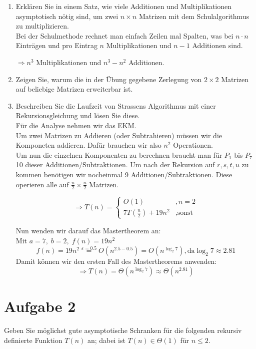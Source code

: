 \documentclass[11pt,a4paper,ngerman]{article}
\begin{document}
\begin{enumerate}[\bfseries (a)]

\item Erklären Sie in einem Satz, wie viele Additionen und Multiplikationen asymptotisch nötig sind, um zwei $n \times n$ Matrizen mit dem Schulalgorithmus zu multiplizieren.\\

Bei der Schulmethode rechnet man einfach Zeilen mal Spalten, was bei $n \cdot n$ Einträgen und pro Eintrag $n$ Multiplikationen und $n-1$ Additionen sind.

$\Rightarrow n^3$ Multiplikationen und $n^3 - n^2$ Additionen.

\item Zeigen Sie, warum die in der Übung gegebene Zerlegung von $2\times2$ Matrizen auf beliebige Matrizen erweiterbar ist.\\

\item Beschreiben Sie die Laufzeit von Strassens Algorithmus mit einer Rekursionsgleichung und lösen Sie diese.\\

Für die Analyse nehmen wir das EKM.\\
Um zwei Matrizen zu Addieren (oder Subtrahieren) müssen wir die Komponeten addieren. Dafür brauchen wir also $n^2$ Operationen.\\
Um nun die einzelnen Komponenten zu berechnen braucht man für $P_1$ bis $P_7$ 10 dieser Additionen/Subtraktionen. Um nach der Rekursion auf $r,s,t,u$ zu kommen benötigen wir nocheinmal 9 Additionen/Subtraktionen. Diese operieren alle auf $\frac{n}{2}\times\frac{n}{2}$ Matrizen.

$$
\Rightarrow T(n) = \left\{ 
\begin{array}{lr}
O(1)&,n = 2\\
7 T(\frac{n}{2}) + 19n^2&,\text{sonst}
\end{array}
\right.
$$

Nun wenden wir darauf das Mastertheorem an:\\
Mit $a=7, \; b=2, \; f(n) = 19n^2$\\
$$
f(n) = 19n^2 \stackrel{\varepsilon = 0.5}{=} O(n^{2.5 - 0.5}) =O( n^{\log_2 7}), \text{da} \log_2 7 \approx 2.81
$$
Damit können wir den ersten Fall des Mastertheorems anwenden:
$$
\Rightarrow T(n) = \Theta \left( n^{\log_2 7} \right) \approx \Theta \left( n^{2.81} \right)
$$
\end{enumerate}

\section*{Aufgabe 2}
Geben Sie möglichst gute asymptotische Schranken für die folgenden rekursiv definierte Funktion $T(n)$ an; dabei ist $T(n) \in \Theta(1)$ für $n \leq 2$.
\end{document}
